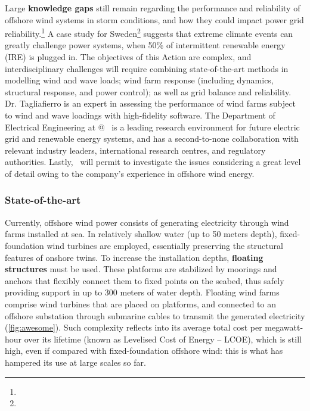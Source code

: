 Large \textbf{knowledge gaps} still remain regarding the performance and reliability of offshore wind systems in storm conditions, and how they could impact power grid reliability.\footnote{} A case study for Sweden\footnote{} suggests that extreme climate events can greatly challenge power systems, when 50\% of intermittent renewable energy (IRE) is plugged in. %
The objectives of this Action are complex, and interdisciplinary challenges will require combining state-of-the-art methods in modelling wind and wave loads; wind farm response (including dynamics, structural response, and power control); as well as grid balance and reliability. Dr. Tagliafierro is an expert in assessing the performance of wind farms subject to wind and wave loadings with high-fidelity software. The Department of Electrical Engineering at @ \UU\ is a leading research environment for future electric grid and renewable energy systems, and has a second-to-none collaboration with relevant industry leaders, international research centres, and regulatory authorities. Lastly, \Hexicon\ will permit to investigate the issues considering a great level of detail owing to the company's experience in offshore wind energy.%

\vspace{-2ex}\subsubsection*{State-of-the-art}\vspace{-1ex}
Currently, offshore wind power consists of generating electricity through wind farms installed at sea. In relatively shallow water (up to 50 meters depth), fixed-foundation wind turbines are employed, essentially preserving the structural features of onshore twins. To increase the installation depths, \textbf{floating structures} must be used. These platforms are stabilized by moorings and anchors that flexibly connect them to fixed points on the seabed, thus safely providing support in up to 300 meters of water depth. Floating wind farms comprise wind turbines that are placed on platforms, and connected to an offshore substation through submarine cables to transmit the generated electricity (\autoref{fig:awesome}). Such complexity reflects into its average total cost per megawatt-hour over its lifetime (known as Levelised Cost of Energy -- LCOE), which is still high, even if compared with fixed-foundation offshore wind: this is what has hampered its use at large scales so far.\vspace{-2ex} %

